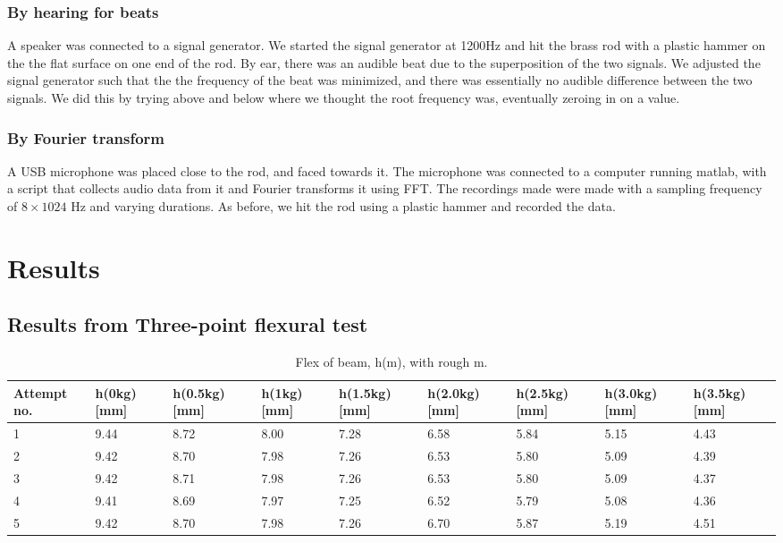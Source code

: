 \documentclass[%
 reprint,
 amsmath,amssymb,
 aps,
]{revtex4-1}
\begin{document}
      \subsubsection{By hearing for beats}
        A speaker was connected to a signal generator. We started the signal generator at 1200Hz and hit the brass rod with a plastic hammer on the the flat surface on one end of the rod. By ear, there was an audible beat due to the superposition of the two signals. We adjusted the signal generator such that the the frequency of the beat was minimized, and there was essentially no audible difference between the two signals. We did this by trying above and below where we thought the root frequency was, eventually zeroing in on a value.

      \subsubsection{By Fourier transform}
        A USB microphone was placed close to the rod, and faced towards it. The microphone was connected to a computer running matlab, with a script that collects audio data from it and Fourier transforms it using FFT. The recordings made were made with a sampling frequency of $8\times1024$ Hz and varying durations. As before, we hit the rod using a plastic hammer and recorded the data.


\section{\label{sect:results}Results}
  \subsection{Results from Three-point flexural test}


  \onecolumngrid %
    \begin{table}[t]
      \caption{Flex of beam, h(m), with rough m.}
      \center
      \begin{tabular}{ | p{1.2cm} | l | l | l | l | l | l | l | l |}
          \hline
          Attempt no. & h(0kg) [mm] & h(0.5kg) [mm] & h(1kg) [mm] & h(1.5kg) [mm] & h(2.0kg) [mm] & h(2.5kg) [mm] & h(3.0kg) [mm] & h(3.5kg) [mm] \\ 
          \hline
          1 & 9.44 & 8.72 & 8.00 & 7.28 & 6.58 & 5.84 & 5.15 & 4.43\\ \hline
          2 & 9.42 & 8.70 & 7.98 & 7.26 & 6.53 & 5.80 & 5.09 & 4.39\\ \hline
          3 & 9.42 & 8.71 & 7.98 & 7.26 & 6.53 & 5.80 & 5.09 & 4.37\\ \hline
          4 & 9.41 & 8.69 & 7.97 & 7.25 & 6.52 & 5.79 & 5.08 & 4.36\\ \hline
          5 & 9.42 & 8.70 & 7.98 & 7.26 & 6.70 & 5.87 & 5.19 & 4.51\\ \hline
      \end{tabular}
      \label{tab:flex}
    \end{table}
  \twocolumngrid %
\end{document}
